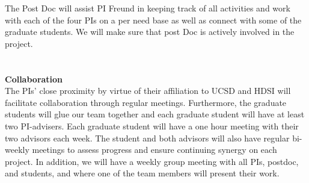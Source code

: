 \documentclass{article}
\begin{document}
The Post Doc will assist PI Freund in keeping track of all activities and work with each of the four PIs on a per need base as well as connect with some of the graduate students. We will make sure that post Doc is actively involved in the project.
\\
\\
\\
{\bf Collaboration}\\ %
The PIs' close proximity by virtue of their affiliation to UCSD and HDSI will facilitate collaboration through regular meetings. Furthermore, the graduate students will glue our team together and each graduate student will have at least two PI-advisers.  
Each graduate student will have a one hour meeting with their
two advisors each week. The student and both advisors will also have regular bi-weekly meetings to assess progress and ensure continuing synergy on each project.  In addition, we will have a weekly group meeting with all PIs, postdoc, and students, and where one of the team members will present their work. 
\end{document}
